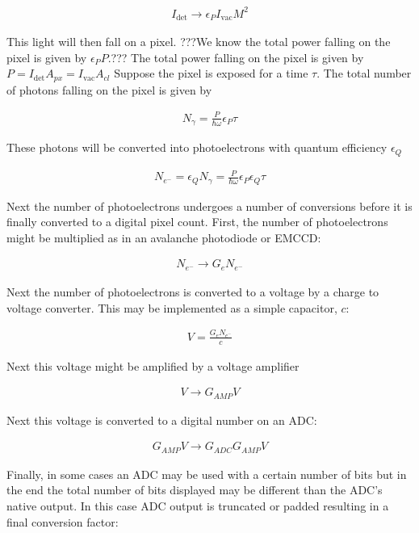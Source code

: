 \documentclass[12pt]{article}
\newcommand{\ep}{\epsilon}
\begin{document}
\begin{align}
I_{\text{det}} \rightarrow \ep_{P} I_{\text{vac}} M^2
\end{align}

This light will then fall on a pixel.
???We know the total power falling on the pixel is given by $\ep_P P$.???
The total power falling on the pixel is given by $P = I_{\text{det}}A_{px} = I_{\text{vac}}A_{cl}$
Suppose the pixel is exposed for a time $\tau$.
The total number of photons falling on the pixel is given by

\begin{align}
N_{\gamma} = \frac{P}{\hbar \omega} \ep_P \tau
\end{align}

These photons will be converted into photoelectrons with quantum efficiency $\ep_Q$

\begin{align}
N_{e^-} = \ep_Q N_{\gamma} = \frac{P}{\hbar \omega} \ep_P \ep_Q \tau
\end{align}

Next the number of photoelectrons undergoes a number of conversions before it is finally converted to a digital pixel count.
First, the number of photoelectrons might be multiplied as in an avalanche photodiode or EMCCD:

\begin{align}
N_{e^-} \rightarrow G_e N_{e^-}
\end{align}

Next the number of photoelectrons is converted to a voltage by a charge to voltage converter.
This may be implemented as a simple capacitor, $c$:

\begin{align}
V = \frac{G_e N_{e^-}}{c}
\end{align}

Next this voltage might be amplified by a voltage amplifier

\begin{align}
V \rightarrow G_{AMP} V
\end{align}

Next this voltage is converted to a digital number on an ADC:

\begin{align}
G_{AMP}V\rightarrow G_{ADC}G_{AMP}V
\end{align}

Finally, in some cases an ADC may be used with a certain number of bits but in the end the total number of bits displayed may be different than the ADC's native output.
In this case ADC output is truncated or padded resulting in a final conversion factor:
\end{document}
